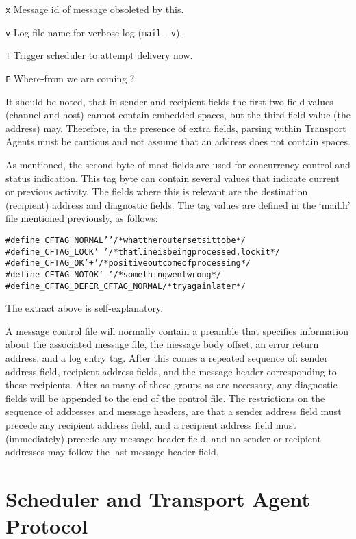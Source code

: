 {\tt x}
Message id of message obsoleted by this.

{\tt v}
Log file name for verbose log ({\tt mail -v}).

{\tt T}
Trigger scheduler to attempt delivery now.

{\tt F}
Where-from we are coming ?               

It should be noted, that in sender and recipient fields the first two field
values (channel and host) cannot contain embedded spaces, but the third
field value (the address) may.  Therefore, in the presence of extra fields,
parsing within Transport Agents must be cautious and not assume that an
address does not contain spaces.

As mentioned, the second byte of most fields are used for concurrency
control and status indication.  This tag byte can contain several values
that indicate current or previous activity.  The fields where this is
relevant are the destination (recipient) address and diagnostic fields.
The tag values are defined in the `mail.h' file mentioned previously, as
follows:
\begin{alltt}
     #define _CFTAG_NORMAL ' ' /* what the router sets it to be */
     #define _CFTAG_LOCK   '~' /* that line is being processed, lock it */
     #define _CFTAG_OK     '+' /* positive outcome of processing */
     #define _CFTAG_NOTOK  '-' /* something went wrong */
     #define _CFTAG_DEFER  _CFTAG_NORMAL /* try again later */
\end{alltt}

The extract above is self-explanatory.

A message control file will normally contain a preamble that specifies
information about the associated message file, the message body offset, an
error return address, and a log entry tag.  After this comes a repeated
sequence of: sender address field, recipient address fields, and the
message header corresponding to these recipients.  After as many of these
groups as are necessary, any diagnostic fields will be appended to the end
of the control file.  The restrictions on the sequence of addresses and
message headers, are that a sender address field must precede any recipient
address field, and a recipient address field must (immediately) precede any
message header field, and no sender or recipient addresses may follow the
last message header field.






\section{Scheduler and Transport Agent Protocol}



